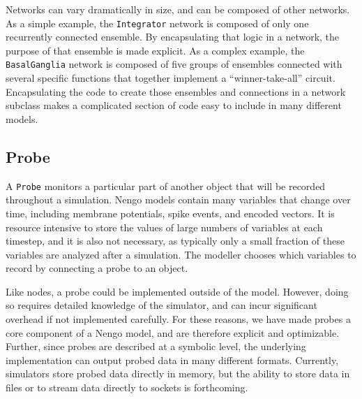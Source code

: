 \documentclass{frontiersSCNS}
\begin{document}
Networks can vary dramatically in size,
and can be composed of other networks.
As a simple example, the \texttt{Integrator} network
is composed of only one recurrently connected ensemble.
By encapsulating that logic in a network,
the purpose of that ensemble is made explicit.
As a complex example,
the \texttt{BasalGanglia} network
is composed of five groups of ensembles
connected with several specific functions
that together implement a ``winner-take-all'' circuit.
Encapsulating the code to create those ensembles
and connections in a network subclass
makes a complicated section of code
easy to include in many different models.

\subsection{Probe}

A \texttt{Probe} monitors
a particular part of another object
that will be recorded throughout a simulation.
Nengo models contain many variables
that change over time,
including membrane potentials,
spike events, and encoded vectors.
It is resource intensive to store the values of
large numbers of variables
at each timestep, and it is also not necessary,
as typically only a small fraction
of these variables are analyzed after a simulation.
The modeller chooses which variables to
record by connecting a probe to an object.

Like nodes, a probe could be implemented
outside of the model.
However, doing so requires detailed knowledge
of the simulator,
and can incur significant overhead
if not implemented carefully.
For these reasons, we have made probes
a core component of a Nengo model,
and are therefore explicit
and optimizable.
Further, since probes are described
at a symbolic level,
the underlying implementation
can output probed data in many different formats.
Currently, simulators store probed data
directly in memory,
but the ability to store data
in files or to stream data
directly to sockets is forthcoming.
\end{document}
